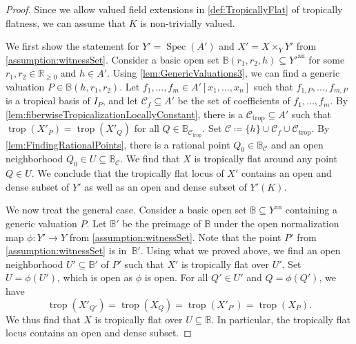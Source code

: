 \documentclass[10pt,a4paper]{amsart}
\DeclareMathOperator{\Spec}{Spec}
\DeclareMathOperator{\trop}{trop}
\newcommand{\RR}{\mathbb{R}}
\newcommand{\an}{{\mathrm{an}}}
\begin{document}
\begin{proof}
  Since we allow valued field extensions in \cref{def:TropicallyFlat} of tropically flatness, we can assume that $K$ is non-trivially valued.

  We first show the statement for $Y'=\Spec(A')$ and $X'=X\times_{Y} Y'$ from \cref{assumption:witnessSet}. Consider a basic open set $\mathbb{B}(r_{1},r_{2},h)\subseteq Y'^{\mathrm{an}}$ for some $r_1,r_2\in\RR_{\geq 0}$ and $h\in{A'}$.
  Using \cref{lem:GenericValuations3}, we can find a generic valuation $P\in \mathbb{B}(h,r_{1},r_{2})$.  Let $f_1,\dots,f_m\in A'[x_1,\dots,x_n]$ such that $f_{1,P},\dots,f_{m,P}$ is a tropical basis of $I_P$, and let $\mathcal C_f\subseteq A'$ be the set of coefficients of $f_1,\dots,f_m$.
  By \cref{lem:fiberwiseTropicalizationLocallyConstant}, there is a $\mathcal C_{\trop}\subseteq A'$ such that $\trop(X'_P)=\trop(X'_Q)$ for all $Q\in\mathbb{B}_{\mathcal{C}_{\trop}}$.
  Set $\mathcal C\coloneqq \{h\}\cup\mathcal C_f\cup\mathcal C_{\trop}$.
  By \cref{lem:FindingRationalPoints}, there is a rational point $Q_{0}\in \mathbb{B}_{\mathcal{C}}$ and an open neighborhood $Q_{0}\in U\subseteq \mathbb{B}_{\mathcal{C}}$.
  We find that $X$ is tropically flat around any point $Q\in{U}$. We conclude that the tropically flat locus of $X'$ contains an open and dense subset of $Y'$ as well as an open and dense subset of $Y'(K)$.

  We now treat the general case.  Consider a basic open set $\mathbb{B}\subseteq Y^\an$ containing a generic valuation $P$.  Let $\mathbb{B}'$ be the preimage of $\mathbb{B}$ under the open normalization map $\phi\colon Y'\to Y$ from \cref{assumption:witnessSet}.  Note that the point $P'$ from \cref{assumption:witnessSet} is in~$\mathbb{B}'$. Using what we proved above, we find an open neighborhood $U'\subseteq \mathbb{B}'$ of $P'$ such that $X'$ is tropically flat over $U'$.  Set $U=\phi(U')$, which is open as $\phi$ is open.  For all $Q'\in U'$ and $Q=\phi(Q')$, we have
  \begin{equation*}
\trop(X'_{Q'})=\trop(X_{Q})=\trop(X'_{P'})=\trop(X_{P}).
  \end{equation*}
  We thus find that $X$ is tropically flat over $U\subseteq \mathbb{B}$. In particular, the tropically flat locus contains an open and dense subset.
\end{proof}
\end{document}
